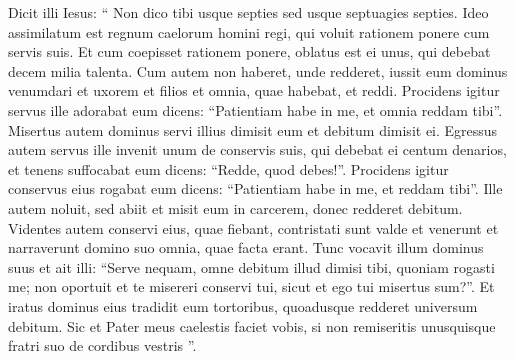 \begin{biblechapter}
\begin{biblechapter}
\begin{biblechapter}
\begin{biblechapter}
\begin{biblechapter}
\begin{biblechapter}
\begin{biblechapter}
\begin{biblechapter}
\begin{biblechapter}
\begin{biblechapter}
\begin{biblechapter}
\begin{biblechapter}
\begin{biblechapter}
\begin{biblechapter}
\begin{biblechapter}
\begin{biblechapter}
\begin{biblechapter}
\begin{biblechapter}
\verse Dicit illi Iesus: “ Non dico tibi usque septies sed usque septuagies septies.
 \verse Ideo assimilatum est regnum caelorum homini regi, qui voluit rationem ponere cum servis suis. 
\verse Et cum coepisset rationem ponere, oblatus est ei unus, qui debebat decem milia talenta. 
\verse Cum autem non haberet, unde redderet, iussit eum dominus venumdari et uxorem et filios et omnia, quae habebat, et reddi. 
\verse Procidens igitur servus ille adorabat eum dicens: “Patientiam habe in me, et omnia reddam tibi”. 
\verse Misertus autem dominus servi illius dimisit eum et debitum dimisit ei. 
\verse Egressus autem servus ille invenit unum de conservis suis, qui debebat ei centum denarios, et tenens suffocabat eum dicens: “Redde, quod debes!”. 
\verse Procidens igitur conservus eius rogabat eum dicens: “Patientiam habe in me, et reddam tibi”. 
\verse Ille autem noluit, sed abiit et misit eum in carcerem, donec redderet debitum.
 \verse Videntes autem conservi eius, quae fiebant, contristati sunt valde et venerunt et narraverunt domino suo omnia, quae facta erant. 
\verse Tunc vocavit illum dominus suus et ait illi: “Serve nequam, omne debitum illud dimisi tibi, quoniam rogasti me; 
\verse non oportuit et te misereri conservi tui, sicut et ego tui misertus sum?”. 
\verse Et iratus dominus eius tradidit eum tortoribus, quoadusque redderet universum debitum. 
\verse Sic et Pater meus caelestis faciet vobis, si non remiseritis unusquisque fratri suo de cordibus vestris ”.
 

\end{biblechapter}
\end{biblechapter}
\end{biblechapter}
\end{biblechapter}
\end{biblechapter}
\end{biblechapter}
\end{biblechapter}
\end{biblechapter}
\end{biblechapter}
\end{biblechapter}
\end{biblechapter}
\end{biblechapter}
\end{biblechapter}
\end{biblechapter}
\end{biblechapter}
\end{biblechapter}
\end{biblechapter}
\end{biblechapter}
